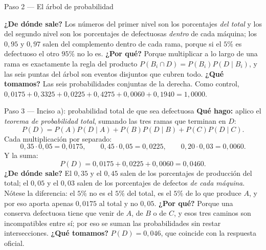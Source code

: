 \documentclass[11pt]{article}
\begin{document}
\begin{sol}
\begin{paso}{Paso 2 --- El árbol de probabilidad}
\begin{center}
\shorthandon{<>}
\end{center}

\textbf{¿De dónde sale?} Los números del primer nivel son los porcentajes \emph{del total} y los del segundo nivel son los porcentajes de defectuosas \emph{dentro} de cada máquina; los $0,95$ y $0,97$ salen del complemento dentro de cada rama, porque si el $5\%$ es defectuoso el otro $95\%$ no lo es.
\textbf{¿Por qué?} Porque multiplicar a lo largo de una rama es exactamente la regla del producto $P(B_i\cap D)=P(B_i)P(D\mid B_i)$, y las seis puntas del árbol son eventos disjuntos que cubren todo.
\textbf{¿Qué tomamos?} Las seis probabilidades conjuntas de la derecha. Como control, $0,0175+0,3325+0,0225+0,4275+0,0060+0,1940=1,0000$.
\end{paso}

\begin{paso}{Paso 3 --- Inciso a): probabilidad total de que sea defectuosa}
\textbf{Qué hago:} aplico el \emph{teorema de probabilidad total}, sumando las tres ramas que terminan en $D$:
\[
P(D)=P(A)P(D\mid A)+P(B)P(D\mid B)+P(C)P(D\mid C).
\]
Cada multiplicación por separado:
\[
0,35\cdot 0,05=0,0175,\qquad 0,45\cdot 0,05=0,0225,\qquad 0,20\cdot 0,03=0,0060.
\]
Y la suma:
\[
P(D)=0,0175+0,0225+0,0060=0,0460.
\]
\textbf{¿De dónde sale?} El $0,35$ y el $0,45$ salen de los porcentajes de producción del total; el $0,05$ y el $0,03$ salen de los porcentajes de defectos \emph{de cada máquina}. Nótese la diferencia: el $5\%$ no es el $5\%$ del total, es el $5\%$ de lo que produce $A$, y por eso aporta apenas $0,0175$ al total y no $0,05$.
\textbf{¿Por qué?} Porque una conserva defectuosa tiene que venir de $A$, de $B$ o de $C$, y esos tres caminos son incompatibles entre sí; por eso se suman las probabilidades sin restar intersecciones.
\textbf{¿Qué tomamos?} $P(D)=0,046$, que coincide con la respuesta oficial.
\end{paso}


\end{sol}
\end{document}
